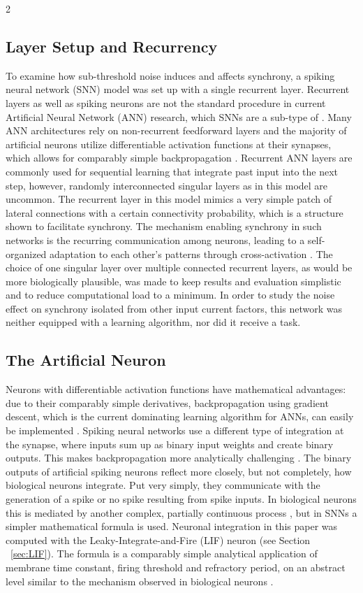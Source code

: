 \documentclass[12pt,a4paper]{article}
\begin{document}
\begin{multicols}{2}
        \subsection{Layer Setup and Recurrency}
			To examine how sub-threshold noise induces and affects synchrony, a spiking neural network (SNN) model was set up with a single recurrent layer. Recurrent layers as well as spiking neurons are not the standard procedure in current Artificial Neural Network (ANN) research, which SNNs are a sub-type of \cite{AA, AB}. Many ANN architectures rely on non-recurrent feedforward layers and the majority of artificial neurons utilize differentiable activation functions at their synapses, which allows for comparably simple backpropagation \cite{A}. Recurrent ANN layers are commonly used for sequential learning that integrate past input into the next step, however, randomly interconnected singular layers as in this model are uncommon. The recurrent layer in this model mimics a very simple patch of lateral connections with a certain connectivity probability, which is a structure shown to facilitate synchrony. The mechanism enabling synchrony in such networks is the recurring communication among neurons, leading to a self-organized adaptation to each other’s patterns through cross-activation \cite{L, AC}. The choice of one singular layer over multiple connected recurrent layers, as would be more biologically plausible, was made to keep results and evaluation simplistic and to reduce computational load to a minimum. In order to study the noise effect on synchrony isolated from other input current factors, this network was neither equipped with a learning algorithm, nor did it receive a task.
            
        \subsection{The Artificial Neuron}           
            Neurons with differentiable activation functions have mathematical advantages: due to their comparably simple derivatives, backpropagation using gradient descent, which is the current dominating learning algorithm for ANNs, can easily be implemented \cite{A, AD}. Spiking neural networks use a different type of integration at the synapse, where inputs sum up as binary input weights and create binary outputs. This makes backpropagation more analytically challenging \cite{AJ}. The binary outputs of artificial spiking neurons reflect more closely, but not completely, how biological neurons integrate. Put very simply, they communicate with the generation of a spike or no spike resulting from spike inputs. In biological neurons this is mediated by another complex, partially continuous process \cite{A}, but in SNNs a simpler mathematical formula is used. Neuronal integration in this paper was computed with the Leaky-Integrate-and-Fire (LIF) neuron (see Section ~\ref{sec:LIF}). The formula is a comparably simple analytical application of membrane time constant, firing threshold and refractory period, on an abstract level similar to the mechanism observed in biological neurons \cite{E}.
            

\end{multicols}
\end{document}
